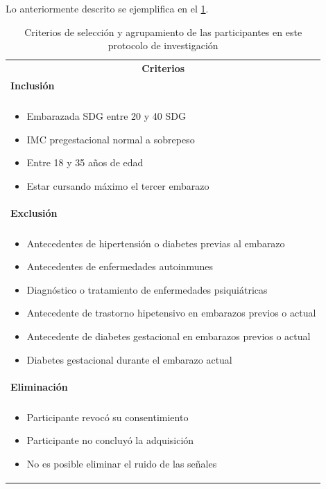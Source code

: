 \documentclass[12pt,letterpaper,spanish, twoside]{article}
\begin{document}
Lo anteriormente descrito se ejemplifica en el \cdr\ref{cdr:criterios}.

\begin{table}
 \centering
 \caption{Criterios de selección y agrupamiento de las participantes en este protocolo de investigación}
 \label{cdr:criterios}
 \begin{tabular}{p{}}
 	\multicolumn{1}{c}{\bf Criterios}\\
    \textbf{Inclusión}\\ \hline\\[-2em]
    \begin{itemize}[itemsep=0.3em]
     \item Embarazada SDG entre 20 y 40 SDG
     \item IMC pregestacional normal a sobrepeso
     \item Entre 18 y 35 años de edad
     \item Estar cursando máximo el tercer embarazo
 	\end{itemize}\\
    \textbf{Exclusión}\\ \hline\\[-2em]
    \begin{itemize}[itemsep=0.3em]
     \item Antecedentes de hipertensión o diabetes previas al embarazo
     \item Antecedentes de enfermedades autoinmunes
     \item Diagnóstico o tratamiento de enfermedades psiquiátricas
     \item Antecedente de trastorno hipetensivo en embarazos previos o actual
     \item Antecedente de diabetes gestacional en embarazos previos o actual
     \item Diabetes gestacional durante el embarazo actual
    \end{itemize}\\
   \textbf{Eliminación}\\ \hline\\[-2em]
   \begin{itemize}[itemsep=0.3em] 
    \item Participante revocó su consentimiento
    \item Participante no concluyó la adquisición
    \item No es posible eliminar el ruido de las señales
   \end{itemize}\\

\end{tabular}
\end{table}
\end{document}
